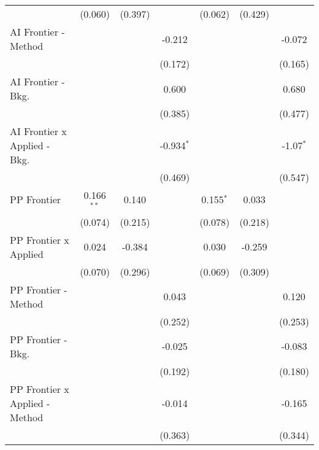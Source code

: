 \begin{tabular}{lcccccc}
                                  & (0.060)      & (0.397)      &              & (0.062)     & (0.429)      &   \\   
   AI Frontier - Method           &              &              & -0.212       &             &              & -0.072\\   
                                  &              &              & (0.172)      &             &              & (0.165)\\   
   AI Frontier - Bkg.             &              &              & 0.600        &             &              & 0.680\\   
                                  &              &              & (0.385)      &             &              & (0.477)\\   
   AI Frontier x Applied - Bkg.   &              &              & -0.934$^{*}$ &             &              & -1.07$^{*}$\\   
                                  &              &              & (0.469)      &             &              & (0.547)\\   
   PP Frontier                    & 0.166$^{**}$ & 0.140        &              & 0.155$^{*}$ & 0.033        &   \\   
                                  & (0.074)      & (0.215)      &              & (0.078)     & (0.218)      &   \\   
   PP Frontier x Applied          & 0.024        & -0.384       &              & 0.030       & -0.259       &   \\   
                                  & (0.070)      & (0.296)      &              & (0.069)     & (0.309)      &   \\   
   PP Frontier - Method           &              &              & 0.043        &             &              & 0.120\\   
                                  &              &              & (0.252)      &             &              & (0.253)\\   
   PP Frontier - Bkg.             &              &              & -0.025       &             &              & -0.083\\   
                                  &              &              & (0.192)      &             &              & (0.180)\\   
   PP Frontier x Applied - Method &              &              & -0.014       &             &              & -0.165\\   
                                  &              &              & (0.363)      &             &              & (0.344)\\   

\end{tabular}
